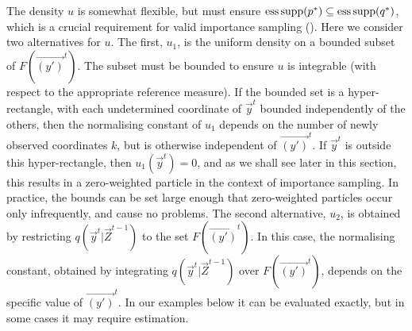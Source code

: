 The density $u$ is somewhat flexible, but must ensure $\operatorname{ess\,supp}(p^*) \subseteq \operatorname{ess\,supp}(q^*)$, which is a crucial requirement for valid importance sampling (\cite{Geweke}). Here we consider two alternatives for $u$. The first, $u_1$, is the uniform density on a bounded subset of $F(\vec{(y')}^{t})$.  The subset must be bounded to ensure $u$ is integrable (with respect to the appropriate reference measure). If the bounded set is a hyper-rectangle, with each undetermined coordinate of $\vec{y}^{t}$ bounded independently of the others, then the normalising constant of $u_1$ depends on the number of newly observed coordinates $k$, but is otherwise independent of $\vec{(y')}^{t}$. If $\vec{y}^t$ is outside this hyper-rectangle, then $u_1(\vec{y}^t) = 0$, and as we shall see later in this section, this results in a zero-weighted particle in the context of importance sampling. In practice, the bounds can be set large enough that zero-weighted particles occur only infrequently, and cause no problems. The second alternative, $u_2$, is obtained by restricting $q(\vec{y}^{t} | \vec{Z}^{t-1})$ to the set $F(\vec{(y')}^{t})$. In this case, the normalising constant, obtained by integrating $q(\vec{y}^{t} | \vec{Z}^{t-1})$ over $F(\vec{(y')}^{t})$, depends on the specific value of $\vec{(y')}^{t}$. In our examples below it can be evaluated exactly, but in some cases it may require estimation. 

